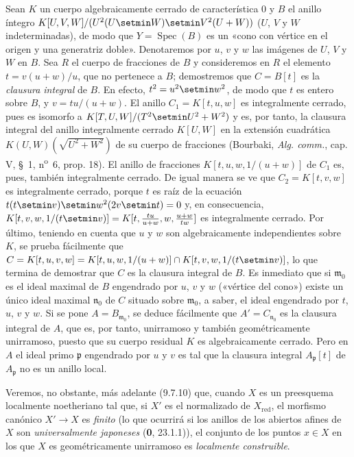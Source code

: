 Sean $K$ un cuerpo algebraicamente cerrado de característica 0
y $B$ el anillo íntegro $K[U,V,W]/(U^2(U\setmin W)\setmin V^2(U+W))$
($U$, $V$ y $W$ indeterminadas), de modo que
$Y=\operatorname{Spec}(B)$ es un «cono con vértice en el origen y
una generatriz doble». Denotaremos por $u$, $v$ y $w$ las imágenes
de $U$, $V$ y $W$ en $B$. Sea $R$ el cuerpo de fracciones de $B$
y consideremos en $R$ el elemento $t=v(u+w)/u$, que no pertenece
a $B$; demostremos que $C=B[t]$ es la \emph{clausura integral} de $B$.
En efecto, $t^2=u^2\setmin w^2$, de modo que $t$ es entero sobre $B$,
y $v=tu/(u+w)$. El anillo $C_1=K[t,u,w]$ es integralmente cerrado,
pues es isomorfo a
$K[T,U,W]/(T^2\setmin U^2+W^2)$ y es, por tanto, la clausura integral
del anillo integralmente cerrado $K[U,W]$ en la extensión
cuadrática $K(U,W)(\sqrt{U^2+W^2})$ de su cuerpo de fracciones
(Bourbaki, \emph{Alg. comm.}, cap. V, §~1, n\textsuperscript{o}~6, prop. 18).
El anillo de fracciones $K[t,u,w,1/(u+w)]$ de $C_1$ es,
pues, también integralmente cerrado. De igual manera se ve que
$C_2=K[t,v,w]$ es integralmente cerrado, porque $t$ es raíz de
la ecuación $t(t\setmin v)\setmin w^2(2v\setmin t)=0$ y, en consecuencia,
$K[t,v,w,1/(t\setmin v)]=K[t,\frac{tu}{u+w},w,\frac{u+w}{tw}]$ es
integralmente cerrado. Por último, teniendo en cuenta que $u$
y $w$ son algebraicamente independientes sobre $K$, se prueba
fácilmente que
$C=K[t,u,v,w]=K[t,u,w,1/(u+w)]\cap K[t,v,w,1/(t\setmin v)]$,
lo que termina de demostrar que $C$ es la clausura integral de
$B$. Es inmediato que si $\mathfrak m_0$ es el ideal maximal de
$B$ engendrado por $u$, $v$ y $w$ («vértice del cono») existe
un único ideal maximal $\mathfrak n_0$ de $C$ situado sobre
$\mathfrak m_0$, a saber, el ideal engendrado por $t$, $u$, $v$
y $w$. Si se pone $A=B_{\mathfrak m_0}$, se deduce fácilmente
que $A'=C_{\mathfrak n_0}$ es la clausura integral de $A$,
que es, por tanto, unirramoso y también geométricamente
unirramoso, puesto que su cuerpo residual $K$ es algebraicamente
cerrado. Pero en $A$ el ideal primo $\mathfrak p$ engendrado por
$u$ y $v$ es tal que la clausura integral $A_\mathfrak p[t]$
de $A_\mathfrak p$ no es un anillo local.

Veremos, no obstante, más adelante (9.7.10) que, cuando $X$ es
un preesquema localmente noetheriano tal que, si $X'$ es el
normalizado de $X_{\mathrm{red}}$, el morfismo canónico
$X'\to X$ es \emph{finito} (lo que ocurrirá si los anillos de los
abiertos afines de $X$ son \emph{universalmente japoneses} (\textbf 0, 23.1.1)),
el conjunto de los puntos $x\in X$ en los que $X$ es
geométricamente unirramoso es \emph{localmente construible}.
